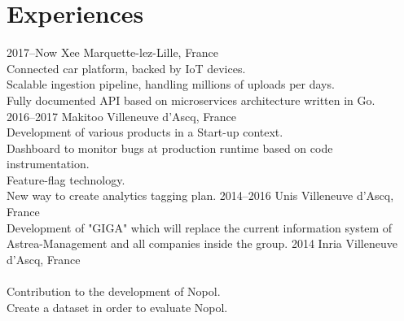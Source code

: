 \documentclass[hidelinks]{cv-style}          %
\begin{document}
\section{Experiences}
\begin{entrylist}
\entry
  {2017--Now}
  {Xee}
  {Marquette-lez-Lille, France}
  {\\
  Connected car platform, backed by IoT devices.\\
  Scalable ingestion pipeline, handling millions of uploads per days.\\  
  Fully documented API based on microservices architecture written in Go.\\
}
\entry
  {2016--2017}
  {Makitoo}
  {Villeneuve d'Ascq, France}
  {\\
  Development of various products in a Start-up context.\\
  Dashboard to monitor bugs at production runtime based on code instrumentation.\\
  Feature-flag technology.\\
  New way to create analytics tagging plan.
}
\entry
  {2014--2016}
  {Unis}
  {Villeneuve d'Ascq, France}
  {\\
  Development of "GIGA" which will replace the current information system of Astrea-Management and all companies inside the group.
}
\entry
  {2014}
  {Inria}
  {Villeneuve d'Ascq, France}
  {\\
  \\
  Contribution to the development of Nopol.\\
  Create a dataset in order to evaluate Nopol.
}


\end{entrylist}
\leavevmode

\end{document}

